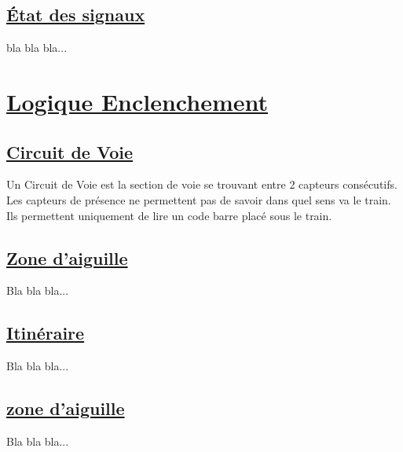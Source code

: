 \subsection{\underline{\'Etat des signaux}}
\label{sec:st_sig}

bla bla bla...
  







\newpage
\section{\underline{Logique Enclenchement}}
\label{sec:log_enc}

\subsection{\underline{Circuit de Voie}}
\label{sec:CdV}

Un Circuit de Voie est la section de voie se trouvant entre 2 capteurs
consécutifs. Les capteurs de présence ne permettent pas de savoir dans
quel sens va le train. Ils permettent uniquement de lire un code barre
placé sous le train.  

\subsection{\underline{Zone d'aiguille}}
\label{sec:aig}

Bla bla bla...


\subsection{\underline{Itinéraire}}
\label{sec:iti}

Bla bla bla...

\subsection{\underline{zone d'aiguille}}
\label{sec:aig}

Bla bla bla...



\newpage





